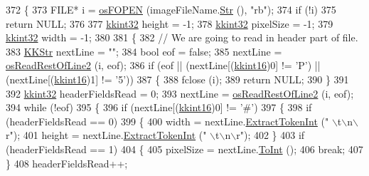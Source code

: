 \begin{DoxyCode}
372 \{
373   FILE* i = \hyperlink{namespace_k_k_b_abf4050d2916ded8349dafadc80f0ecd1}{osFOPEN} (imageFileName.\hyperlink{class_k_k_b_1_1_k_k_str_ad574e6c0fe7f6ce1ba3ab0a8ce2fbd52}{Str} (), \textcolor{stringliteral}{"rb"});
374   \textcolor{keywordflow}{if}  (!i)
375     \textcolor{keywordflow}{return} NULL;
376 
377   \hyperlink{namespace_k_k_b_a8fa4952cc84fda1de4bec1fbdd8d5b1b}{kkint32}  height    = -1;
378   \hyperlink{namespace_k_k_b_a8fa4952cc84fda1de4bec1fbdd8d5b1b}{kkint32}  pixelSize = -1;
379   \hyperlink{namespace_k_k_b_a8fa4952cc84fda1de4bec1fbdd8d5b1b}{kkint32}  width     = -1;
380 
381   \{
382     \textcolor{comment}{// We are going to read in header part of file.}
383     \hyperlink{class_k_k_b_1_1_k_k_str}{KKStr}  nextLine = \textcolor{stringliteral}{""};
384     \textcolor{keywordtype}{bool}  eof = \textcolor{keyword}{false};
385     nextLine = \hyperlink{namespace_k_k_b_a9358e2392d643851dace4e58faad0c8a}{osReadRestOfLine2} (i, eof);
386     \textcolor{keywordflow}{if}  (eof  ||  (nextLine[(\hyperlink{namespace_k_k_b_a93809780ee294124dda4c23069f41248}{kkint16})0] != \textcolor{charliteral}{'P'})  ||  (nextLine[(\hyperlink{namespace_k_k_b_a93809780ee294124dda4c23069f41248}{kkint16})1] != \textcolor{charliteral}{'5'}))
387     \{
388       fclose (i);
389       \textcolor{keywordflow}{return} NULL;
390     \}
391 
392     \hyperlink{namespace_k_k_b_a8fa4952cc84fda1de4bec1fbdd8d5b1b}{kkint32}  headerFieldsRead = 0;
393     nextLine = \hyperlink{namespace_k_k_b_a9358e2392d643851dace4e58faad0c8a}{osReadRestOfLine2} (i, eof);
394     \textcolor{keywordflow}{while}  (!eof)
395     \{
396       \textcolor{keywordflow}{if}  (nextLine[(\hyperlink{namespace_k_k_b_a93809780ee294124dda4c23069f41248}{kkint16})0] != \textcolor{charliteral}{'#'})
397       \{
398         \textcolor{keywordflow}{if}  (headerFieldsRead == 0)
399         \{
400           width  = nextLine.\hyperlink{class_k_k_b_1_1_k_k_str_ae50047144b908273ffd004bd9379f6d0}{ExtractTokenInt} (\textcolor{stringliteral}{" \(\backslash\)t\(\backslash\)n\(\backslash\)r"});
401           height = nextLine.\hyperlink{class_k_k_b_1_1_k_k_str_ae50047144b908273ffd004bd9379f6d0}{ExtractTokenInt} (\textcolor{stringliteral}{" \(\backslash\)t\(\backslash\)n\(\backslash\)r"});
402         \}
403         \textcolor{keywordflow}{if}  (headerFieldsRead == 1)
404         \{
405           pixelSize = nextLine.\hyperlink{class_k_k_b_1_1_k_k_str_a4d1582f17461a3fe481fc4a37e8c65c7}{ToInt} ();
406           \textcolor{keywordflow}{break};
407         \}
408         headerFieldsRead++;

\end{DoxyCode}
